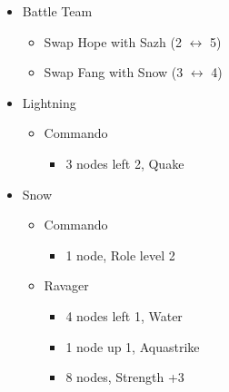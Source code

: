 	\renewcommand{\first}{[1] Strike Team (\com/\syn/\com)}
	\renewcommand{\second}{[2] Tri-Disaster (\rav/\rav/\rav)}
	\renewcommand{\third}{[3] Tri-Disaster (\rav/\rav/\rav)}
	\renewcommand{\fourth}{[4] Cerberus (\com/\com/\com)}
	\renewcommand{\fifth}{[5] Cerberus (\com/\com/\com)}
	\begin{menu}
		\begin{itemize}
			\paradigm
			\begin{itemize}
				\item Battle Team
				      \begin{itemize}
					      \item Swap Hope with Sazh (2 $\leftrightarrow$ 5)
					      \item Swap Fang with Snow (3 $\leftrightarrow$ 4)
				      \end{itemize}
				      {\paradigmline[1]{\textit{\com}}{\textit{\syn}}{\textit{(\com)}}}%
				      {\paradigmline{(\rav)}{\rav}{\rav}}%
				      {\paradigmline{[\rav]}{(\rav)}{(\rav)}}%
				      {\paradigmline{\com}{[\com]}{\com}}%
				      {\paradigmline{\com}{[\com]}{\com}}
			\end{itemize}
			\crystarium
			\begin{itemize}
				\item Lightning
				      \begin{itemize}
					      \item Commando
					            \begin{itemize}
						            \item 3 nodes left 2, Quake
					            \end{itemize}
				      \end{itemize}
				\item Snow
				      \begin{itemize}
					      \item Commando
					            \begin{itemize}
						            \item 1 node, Role level 2
					            \end{itemize}
					      \item Ravager
					            \begin{itemize}
						            \item 4 nodes left 1, Water
						            \item 1 node up 1, Aquastrike
						            \item 8 nodes, Strength +3

\end{itemize}
\end{itemize}
\end{itemize}
\end{itemize}
\end{menu}
